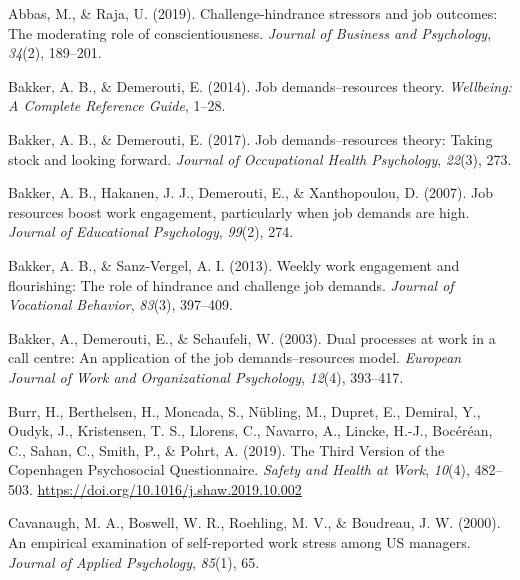 \documentclass[
  man]{apa6}
\newlength{\cslhangindent}
\newlength{\cslentryspacingunit} %
\newenvironment{CSLReferences}[2] %
 {%
  \setlength{\parindent}{0pt}
  \ifodd #1
  \let\oldpar\par
  \def\par{\hangindent=\cslhangindent\oldpar}
  \fi
  \setlength{\parskip}{#2\cslentryspacingunit}
 }%
 {}
\begin{document}
\hypertarget{refs}{}
\begin{CSLReferences}{1}{0}
\leavevmode{}%
Abbas, M., \& Raja, U. (2019). Challenge-hindrance stressors and job outcomes: The moderating role of conscientiousness. \emph{Journal of Business and Psychology}, \emph{34}(2), 189--201.

\leavevmode{}%
Bakker, A. B., \& Demerouti, E. (2014). Job demands--resources theory. \emph{Wellbeing: A Complete Reference Guide}, 1--28.

\leavevmode{}%
Bakker, A. B., \& Demerouti, E. (2017). Job demands--resources theory: Taking stock and looking forward. \emph{Journal of Occupational Health Psychology}, \emph{22}(3), 273.

\leavevmode{}%
Bakker, A. B., Hakanen, J. J., Demerouti, E., \& Xanthopoulou, D. (2007). Job resources boost work engagement, particularly when job demands are high. \emph{Journal of Educational Psychology}, \emph{99}(2), 274.

\leavevmode{}%
Bakker, A. B., \& Sanz-Vergel, A. I. (2013). Weekly work engagement and flourishing: The role of hindrance and challenge job demands. \emph{Journal of Vocational Behavior}, \emph{83}(3), 397--409.

\leavevmode{}%
Bakker, A., Demerouti, E., \& Schaufeli, W. (2003). Dual processes at work in a call centre: An application of the job demands--resources model. \emph{European Journal of Work and Organizational Psychology}, \emph{12}(4), 393--417.

\leavevmode{}%
Burr, H., Berthelsen, H., Moncada, S., Nübling, M., Dupret, E., Demiral, Y., Oudyk, J., Kristensen, T. S., Llorens, C., Navarro, A., Lincke, H.-J., Bocéréan, C., Sahan, C., Smith, P., \& Pohrt, A. (2019). The {Third} {Version} of the {Copenhagen} {Psychosocial} {Questionnaire}. \emph{Safety and Health at Work}, \emph{10}(4), 482--503. \url{https://doi.org/10.1016/j.shaw.2019.10.002}

\leavevmode{}%
Cavanaugh, M. A., Boswell, W. R., Roehling, M. V., \& Boudreau, J. W. (2000). An empirical examination of self-reported work stress among US managers. \emph{Journal of Applied Psychology}, \emph{85}(1), 65.


\end{CSLReferences}
\end{document}
